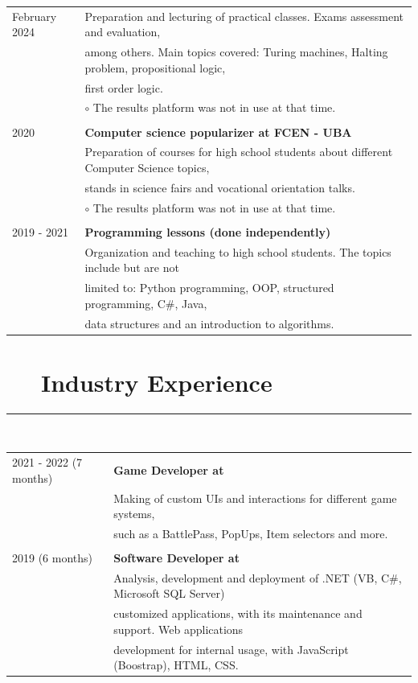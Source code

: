 \documentclass{article}
\newcommand{\shade}[1]{\textcolor{myGray}{#1}}
\begin{document}
\begin{longtable}{l | l}
    February 2024  & Preparation and lecturing of practical classes. Exams assessment and evaluation, \\
                   & among others. \shade{Main topics covered: Turing machines, Halting problem, propositional logic,} \\
                   & \shade{first order logic.} \\
                   & \indent $\circ$ \shade{The results platform was not in use at that time.} \\
                    \\
2020  & \textbf{Computer science popularizer at FCEN - UBA} \\
                     & Preparation of courses for high school students about different Computer Science topics, \\
                     & stands in science fairs and vocational orientation talks. \\
                     & \indent $\circ$ \shade{The results platform was not in use at that time.} \\
                     \\
    2019 - 2021     & \textbf{Programming lessons (done independently)}  \\
                    & Organization and teaching to high school students. The topics include but are not \\
                    & limited to: Python programming, OOP, structured programming, C\#, Java, \\
                    & data structures and an introduction to algorithms.
\end{longtable}


\section*{\faIndustry ~~ Industry Experience}
\hrule

\
\newline
\

\begin{longtable}{l | l}
    2021 - 2022 (7 months) & \textbf{Game Developer at \say{Globant}} \\
                           & Making of custom UIs and interactions for different game systems, \\
                           & such as a BattlePass, PopUps, Item selectors and more. \\
                           \\
    2019 (6 months) & \textbf{Software Developer at \say{Seincomp Informática}} \\
                    &  Analysis, development and deployment of .NET (VB, C\#, Microsoft SQL Server) \\
                    & customized applications, with its maintenance and support. Web applications \\
                    & development for internal usage, with JavaScript (Boostrap), HTML, CSS.\\
\end{longtable}
\end{document}
